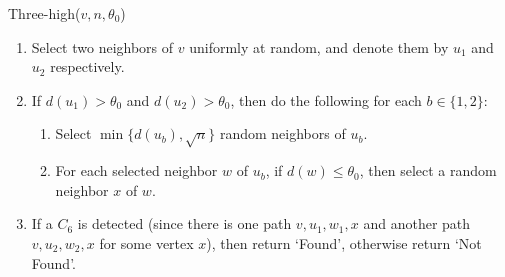 \documentclass{article}
\newtheorem{claim}[lemma]{Claim}
\newcommand{\commentt}[1]{ {}}
\begin{document}
\smallskip\noindent
\textsf{Three-high}($v,n,\theta_0$)
\begin{enumerate}
   \item Select two neighbors of $v$ uniformly at random, and denote them by $u_1$ and $u_2$ respectively.
   \item %
          If $d(u_1)> \theta_0$ and $d(u_2) > \theta_0$, then do the following for each $b\in \{1,2\}$:
   \begin{enumerate}
     \item  Select $\min\{d(u_b),\sqrt{n}\}$ random neighbors of $u_b$.
     \item For each selected neighbor $w$ of $u_b$,  if $d(w) \leq \theta_0$, then select a random neighbor $x$ of $w$. \commentt{DR: to be completely consistent with the reduction, we need to check that $w$ selected $u_b$ as one of its neighbors, or maybe do this only in the analysis}
   \end{enumerate}
   \item If a $C_6$ is detected (since there is one path $v,u_1,w_1,x$ and another path $v,u_2,w_2,x$ for some vertex $x$), then return `Found', otherwise return `Not Found'.
\end{enumerate}
\fi

\end{document}
